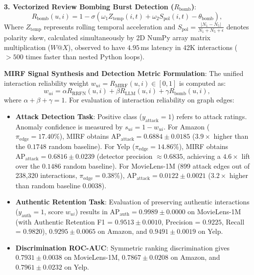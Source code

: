 \documentclass[10pt,journal]{IEEEtran}
\begin{document}
\textbf{3. Vectorized Review Bombing Burst Detection ($R_{\text{bomb}}$)}:
\begin{equation}
    R_{\text{bomb}}(u, i) = 1 - \sigma\left(\omega_1 Z_{\text{temp}}(i, t) + \omega_2 S_{\text{pol}}(i, t) - \theta_{\text{bomb}}\right),
\end{equation}
Where $Z_{\text{temp}}$ represents rolling temporal acceleration and $S_{\text{pol}} = \frac{|N_1 - N_5|}{N_1 + N_5 + \epsilon}$ denotes polarity skew, calculated simultaneously by 2D NumPy array matrix multiplication ($W @ X$), observed to have $4.95\,$ms latency in 42K interactions ($>500$ times faster than nested Python loops).

\textbf{MIRF Signal Synthesis and Detection Metric Formulation}: The unified interaction reliability weight $w_{ui} = R_{\text{MIRF}}(u, i) \in [0, 1]$ is computed as:
\begin{equation}
    w_{ui} = \alpha R_{\text{RRFN}}(u, i) + \beta R_{\text{LLM}}(u, i) + \gamma R_{\text{bomb}}(u, i),
\end{equation}
where $\alpha + \beta + \gamma = 1$. For evaluation of interaction reliability on graph edges:
\begin{itemize}
    \item \textbf{Attack Detection Task}: Positive class ($y_{\text{attack}}=1$) refers to attack ratings. Anomaly confidence is measured by $s_{ui} = 1 - w_{ui}$. For Amazon ($\pi_{\text{edge}} = 17.40\%$), MIRF obtains $\text{AP}_{\text{attack}} = \mathbf{0.6884 \pm 0.0185}$ ($3.9\times$ higher than the $0.1748$ random baseline). For Yelp ($\pi_{\text{edge}} = 14.86\%$), MIRF obtains $\text{AP}_{\text{attack}} = \mathbf{0.6816 \pm 0.0239}$ (detector precision $\approx 0.6835$, achieving a $4.6\times$ lift over the $0.1486$ random baseline). For MovieLens-1M (899 attack edges out of 238,320 interactions, $\pi_{\text{edge}} = 0.38\%$), $\text{AP}_{\text{attack}} = \mathbf{0.0122 \pm 0.0021}$ ($3.2\times$ higher than random baseline $0.0038$).
    \item \textbf{Authentic Retention Task}: Evaluation of preserving authentic interactions ($y_{\text{auth}}=1$, score $w_{ui}$) results in $\text{AP}_{\text{auth}} = \mathbf{0.9989 \pm 0.0000}$ on MovieLens-1M (with Authentic Retention F1 = $\mathbf{0.9513 \pm 0.0010}$, Precision = $0.9225$, Recall = $0.9820$), $\mathbf{0.9295 \pm 0.0065}$ on Amazon, and $\mathbf{0.9491 \pm 0.0019}$ on Yelp.
    \item \textbf{Discrimination ROC-AUC}: Symmetric ranking discrimination gives $\mathbf{0.7931 \pm 0.0038}$ on MovieLens-1M, $\mathbf{0.7867 \pm 0.0208}$ on Amazon, and $\mathbf{0.7961 \pm 0.0232}$ on Yelp.
\end{itemize}
\end{document}
